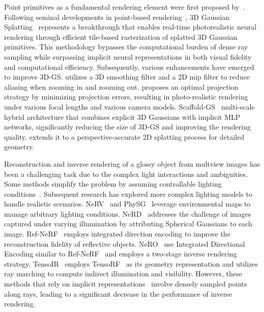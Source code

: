 Point primitives as a fundamental rendering element were first proposed by~\cite{levoy1985use}. Following seminal developments in point-based rendering~\cite{aliev2020neural,xu2022point,zhang2022differentiable}, 3D Gaussian Splatting~\cite{kerbl20233d} represents a breakthrough that enables real-time photorealistic neural rendering through efficient tile-based rasterization of splatted 3D Gaussian primitives. This methodology bypasses the computational burden of dense ray sampling while surpassing implicit neural representations in both visual fidelity and computational efficiency. Subsequently, various enhancements have emerged to improve 3D-GS. \cite{Yu2023MipSplatting} utilizes a 3D smoothing filter and a 2D mip filter to reduce aliasing when zooming in and zooming out. \cite{huang2024erroranalysis3dgaussian} proposes an optimal projection strategy by minimizing projection errors, resulting in photo-realistic rendering under various focal lengths and various camera models. Scaffold-GS~\cite{lu2024scaffold} multi-scale hybrid architecture that combines explicit 3D Gaussians with implicit MLP networks, significantly reducing the size of 3D-GS and improving the rendering quality. \cite{Huang2DGS2024} extends it to a perspective-accurate 2D splatting process for detailed geometry. 



Reconstruction and inverse rendering of a glossy object from multview images has been a challenging task due to the complex light interactions and ambiguities. Some methods simplify the problem by assuming controllable lighting conditions~\cite{azinovic2019inverse,guo2019relightables,park2020seeing,bi2020DRV,bi2020deep3d,nam2018practical,schmitt2020joint,bi2020NRF}. Subsequent research has explored more complex lighting models to handle realistic scenarios. NeRV~\cite{srinivasan2021nerv} and PhySG~\cite{zhang2021physg} leverage environmental maps to manage arbitrary lighting conditions. NeRD~\cite{boss2021nerd} addresses the challenge of images captured under varying illumination by attributing Spherical Gaussians to each image.  Ref-NeRF~\cite{verbin2022ref} employs integrated direction encoding to improve the reconstruction fidelity of reflective objects. NeRO~\cite{liu2023nero} use Integrated Directional Encoding similar to Ref-NeRF~\cite{verbin2022ref} and employs a two-stage inverse rendering strategy. TensoIR~\cite{jin2023tensoir} employs TensoRF~\cite{chen2022tensorf} as its geometry representation and utilizes ray marching to compute indirect illumination and visibility. However, these methods that rely on implicit representations~\cite{zhang2021physg, verbin2022ref, liu2023nero, karis2013real, jin2023tensoir, srinivasan2021nerv, wu2023nerf, zeng2023relighting} involve densely sampled points along rays, leading to a significant decrease in the performance of inverse rendering.  


